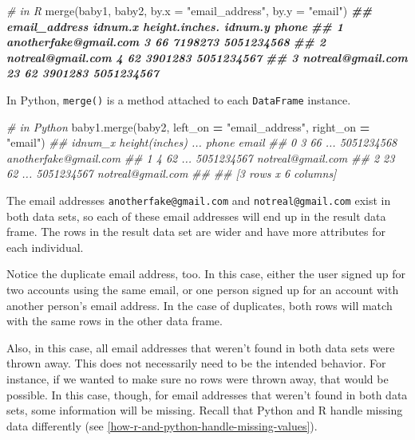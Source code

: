 \documentclass[
  12pt,
  krantz2]{krantz}
\makeatletter
\newenvironment{Shaded}{\begin{snugshade}}{\end{snugshade}}
\newcommand{\AttributeTok}[1]{\textcolor[rgb]{0.61,0.61,0.61}{#1}}
\newcommand{\CommentTok}[1]{\textcolor[rgb]{0.37,0.37,0.37}{\textit{#1}}}
\newcommand{\DocumentationTok}[1]{\textcolor[rgb]{0.37,0.37,0.37}{\textbf{\textit{#1}}}}
\newcommand{\FunctionTok}[1]{\textcolor[rgb]{0,0,0}{#1}}
\newcommand{\NormalTok}[1]{#1}
\newcommand{\OperatorTok}[1]{\textcolor[rgb]{0.43,0.43,0.43}{\textbf{#1}}}
\newcommand{\StringTok}[1]{\textcolor[rgb]{0.5,0.5,0.5}{#1}}
\newenvironment{kframe}{%
\medskip{}
\setlength{\fboxsep}{.8em}
 \def\at@end@of@kframe{}%
 \ifinner\ifhmode%
  \def\at@end@of@kframe{\end{minipage}}%
  \begin{minipage}{\columnwidth}%
 \fi\fi%
 \def\FrameCommand##1{\hskip\@totalleftmargin \hskip-\fboxsep
 \colorbox{shadecolor}{##1}\hskip-\fboxsep
     \hskip-\linewidth \hskip-\@totalleftmargin \hskip\columnwidth}%
 \MakeFramed {\advance\hsize-\width
   \@totalleftmargin\z@ \linewidth\hsize
   \@setminipage}}%
 {\par\unskip\endMakeFramed%
 \at@end@of@kframe}
\renewenvironment{Shaded}{\begin{kframe}}{\end{kframe}}
\makeatother
\begin{document}
\begin{Shaded}
\begin{Highlighting}[]
\CommentTok{\# in R}
\FunctionTok{merge}\NormalTok{(baby1, baby2, }\AttributeTok{by.x =} \StringTok{"email\_address"}\NormalTok{, }\AttributeTok{by.y =} \StringTok{"email"}\NormalTok{)}
\DocumentationTok{\#\#           email\_address idnum.x height.inches. idnum.y      phone}
\DocumentationTok{\#\# 1 anotherfake@gmail.com       3             66 7198273 5051234568}
\DocumentationTok{\#\# 2     notreal@gmail.com       4             62 3901283 5051234567}
\DocumentationTok{\#\# 3     notreal@gmail.com      23             62 3901283 5051234567}
\end{Highlighting}
\end{Shaded}

In Python, \texttt{merge()} is a method attached to each \texttt{DataFrame} instance.

\begin{Shaded}
\begin{Highlighting}[]
\CommentTok{\# in Python}
\NormalTok{baby1.merge(baby2, left\_on }\OperatorTok{=} \StringTok{"email\_address"}\NormalTok{, right\_on }\OperatorTok{=} \StringTok{"email"}\NormalTok{)}
\CommentTok{\#\#    idnum\_x  height(inches)  ...       phone                  email}
\CommentTok{\#\# 0        3              66  ...  5051234568  anotherfake@gmail.com}
\CommentTok{\#\# 1        4              62  ...  5051234567      notreal@gmail.com}
\CommentTok{\#\# 2       23              62  ...  5051234567      notreal@gmail.com}
\CommentTok{\#\# }
\CommentTok{\#\# [3 rows x 6 columns]}
\end{Highlighting}
\end{Shaded}

The email addresses \texttt{anotherfake@gmail.com} and \texttt{notreal@gmail.com} exist in both data sets, so each of these email addresses will end up in the result data frame. The rows in the result data set are wider and have more attributes for each individual.

Notice the duplicate email address, too. In this case, either the user signed up for two accounts using the same email, or one person signed up for an account with another person's email address. In the case of duplicates, both rows will match with the same rows in the other data frame.

Also, in this case, all email addresses that weren't found in both data sets were thrown away. This does not necessarily need to be the intended behavior. For instance, if we wanted to make sure no rows were thrown away, that would be possible. In this case, though, for email addresses that weren't found in both data sets, some information will be missing. Recall that Python and R handle missing data differently (see \ref{how-r-and-python-handle-missing-values}).
\end{document}
